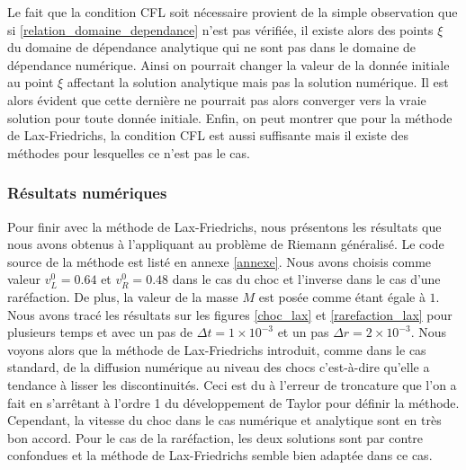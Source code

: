 \documentclass[11pt,a4paper]{article}
\begin{document}
Le fait que la condition CFL soit nécessaire provient de la simple observation que si \eqref{relation_domaine_dependance} n'est pas vérifiée, il existe alors des points $\xi$ du domaine de dépendance analytique qui ne sont pas dans le domaine de dépendance numérique. Ainsi on pourrait changer la valeur de la donnée initiale au point $\xi$ affectant la solution analytique mais pas la solution numérique. Il est alors évident que cette dernière ne pourrait pas alors converger vers la vraie solution pour toute donnée initiale.
Enfin, on peut montrer \cite{leveque1992numerical} que pour la méthode de Lax-Friedrichs, la condition CFL est aussi suffisante mais il existe des méthodes pour lesquelles ce n'est pas le cas.

\subsubsection{Résultats numériques}

Pour finir avec la méthode de Lax-Friedrichs, nous présentons les résultats que nous avons obtenus à l'appliquant au problème de Riemann généralisé. Le code source de la méthode est listé en annexe \ref{annexe}.
Nous avons choisis comme valeur $v_L^0 = 0.64$ et $v_R^0 = 0.48$ dans le cas du choc et l'inverse dans le cas d'une raréfaction. De plus, la valeur de la masse $M$ est posée comme étant égale à $1$. Nous avons tracé les résultats sur les figures \ref{choc_lax} et \ref{rarefaction_lax} pour plusieurs temps et avec un pas de $\Delta t = 1\times 10^{-3}$ et un pas $\Delta r = 2\times 10^{-3}$. Nous voyons alors que la méthode de Lax-Friedrichs introduit, comme dans le cas standard, de la diffusion numérique au niveau des chocs c'est-à-dire qu'elle a tendance à lisser les discontinuités. Ceci est du à l'erreur de troncature que l'on a fait en s'arrêtant à l'ordre 1 du développement de Taylor pour définir la méthode. Cependant, la vitesse du choc dans le cas numérique et analytique sont en très bon accord. Pour le cas de la raréfaction, les deux solutions sont par contre confondues et la méthode de Lax-Friedrichs semble bien adaptée dans ce cas.
\end{document}
